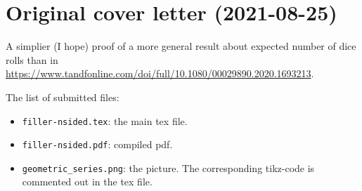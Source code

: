 \documentclass[12pt]{article}
\begin{document}
\section*{Original cover letter (2021-08-25)}

A simplier (I hope) proof of a more general result about 
expected number of dice rolls than in \url{https://www.tandfonline.com/doi/full/10.1080/00029890.2020.1693213}.

The list of submitted files:
\begin{itemize}
  \item \verb|filler-nsided.tex|: the main tex file.
  \item \verb|filler-nsided.pdf|: compiled pdf.
  \item \verb|geometric_series.png|: the picture. The corresponding tikz-code is commented out in the tex file. 
\end{itemize}
\end{document}
